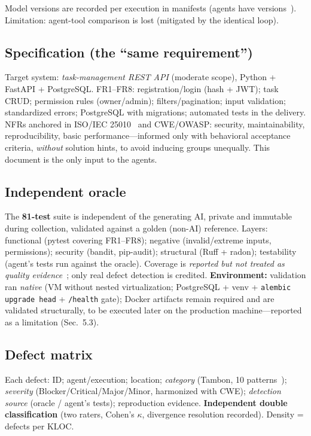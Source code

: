 \documentclass[sigconf,anonymous]{acmart}
\begin{document}
Model versions are recorded per execution in manifests (agents have versions~\cite{F05}). Limitation: agent-tool comparison is lost (mitigated by the identical loop).

\subsection{Specification (the ``same requirement'')}
Target system: \emph{task-management REST API} (moderate scope), Python + FastAPI + PostgreSQL. FR1--FR8: registration/login (hash + JWT); task CRUD; permission rules (owner/admin); filters/pagination; input validation; standardized errors; PostgreSQL with migrations; automated tests in the delivery. NFRs anchored in ISO/IEC 25010~\cite{D04} and CWE/OWASP: security, maintainability, reproducibility, basic performance---informed only with behavioral acceptance criteria, \emph{without} solution hints, to avoid inducing groups unequally. This document is the only input to the agents.

\subsection{Independent oracle}
The \textbf{81-test} suite is independent of the generating AI, private and immutable during collection, validated against a golden (non-AI) reference. Layers: functional (pytest covering FR1--FR8); negative (invalid/extreme inputs, permissions); security (bandit, pip-audit); structural (Ruff + radon); testability (agent's tests run against the oracle). Coverage is \emph{reported but not treated as quality evidence}~\cite{C05}; only real defect detection is credited. \textbf{Environment:} validation ran \emph{native} (VM without nested virtualization; PostgreSQL + venv + \texttt{alembic upgrade head} + \texttt{/health} gate); Docker artifacts remain required and are validated structurally, to be executed later on the production machine---reported as a limitation (Sec.~5.3).

\subsection{Defect matrix}
Each defect: ID; agent/execution; location; \emph{category} (Tambon, 10 patterns~\cite{B01}); \emph{severity} (Blocker/Critical/Major/Minor, harmonized with CWE); \emph{detection source} (oracle / agent's tests); reproduction evidence. \textbf{Independent double classification} (two raters, Cohen's $\kappa$, divergence resolution recorded). Density = defects per KLOC.
\end{document}
